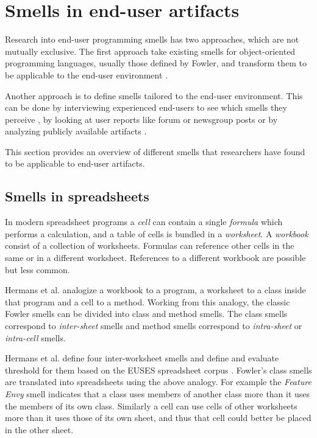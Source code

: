\documentclass[10pt,conference,compsocconf]{IEEEtran}
\begin{document}

\section{Smells in end-user artifacts}
\label{sec:smells}
Research into end-user programming smells has two approaches, which are not mutually exclusive.
The first approach take existing smells for object-oriented programming languages, usually those defined by Fowler, and transform them to be applicable to the end-user environment \cite{Hermans2012inter,Hermans2012intra,Stolee2011}.

Another approach is to define smells tailored to the end-user environment.
This can be done by interviewing experienced end-users to see which smells they perceive \cite{chambers2013smell}, by looking at user reports like forum or newsgroup posts or by analyzing publicly available artifacts \cite{Stolee2011}.

This section provides an overview of different smells that researchers have found to be applicable to end-user artifacts.

\subsection{Smells in spreadsheets}

In modern spreadsheet programs a \textit{cell} can contain a single \textit{formula} which performs a calculation, and a table of cells is bundled in a \textit{worksheet}.
A \textit{workbook} consist of a collection of worksheets.
Formulas can reference other cells in the same or in a different worksheet.
References to a different workbook are possible but less common.
 
Hermans et al. \cite{Hermans2012inter} \cite{Hermans2012intra} analogize a workbook to a program, a worksheet to a class inside that program and a cell to a method.
Working from this analogy, the classic Fowler smells can be divided into class and method smells.
The class smells correspond to \textit{inter-sheet} smells and method smells correspond to \textit{intra-sheet} or \textit{intra-cell} smells.

Hermans et al. \cite{Hermans2012inter} define four inter-worksheet smells and define and evaluate threshold for them based on the EUSES spreadsheet corpus \cite{fisher2005euses}.
Fowler's class smells are translated into spreadsheets using the above analogy. 
For example the \textit{Feature Envy} smell indicates that a class uses members of another class more than it uses the members of its own class.
Similarly a cell can use cells of other worksheets more than it uses those of its own sheet, and thus that cell could better be placed in the other sheet.
\end{document}
